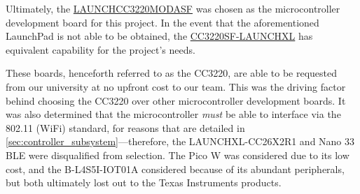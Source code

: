 \begin{flushleft}
	Ultimately, the \href{https://www.ti.com/tool/LAUNCHCC3220MODASF}{LAUNCHCC3220MODASF}
	was chosen as the microcontroller development board for this project. In the event that the
	aforementioned LaunchPad is not able to be obtained, the
	\href{https://www.ti.com/tool/CC3220SF-LAUNCHXL}{CC3220SF-LAUNCHXL} has equivalent capability
	for the project's needs.
\end{flushleft}
\begin{flushleft}
	These boards, henceforth referred to as the CC3220, are able to be requested from our
	university at no upfront cost to our team. This was the driving factor behind choosing 
	the CC3220 over other microcontroller development boards. It was also determined that
	the microcontroller \emph{must} be able to interface via the 802.11 (WiFi) standard, for reasons
	that are detailed in \autoref{sec:controller_subsystem}---therefore, the LAUNCHXL-CC26X2R1
	and Nano 33 BLE were disqualified from selection. The Pico W was considered due to its low cost,
	and the B-L4S5I-IOT01A considered because of its abundant peripherals, but both ultimately lost
	out to the Texas Instruments products.
\end{flushleft}

